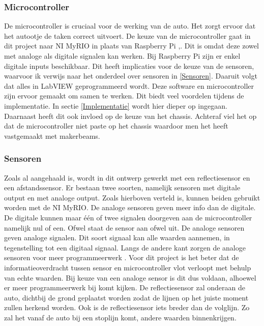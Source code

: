 \documentclass[a4paper,twoside,kulak]{kulakreport} %
\begin{document}
\subsubsection{Microcontroller}
De microcontroller is cruciaal voor de werking van de auto. Het zorgt ervoor dat het autootje de taken correct uitvoert. De keuze van de microcontroller gaat in dit project naar NI MyRIO in plaats van Raspberry Pi \cite{nimyrio},\cite{RaspberryPi}.
Dit is omdat deze zowel met analoge als digitale signalen kan werken. 
Bij Raspberry Pi zijn er enkel digitale inputs beschikbaar. Dit heeft implicaties voor de keuze van de sensoren, waarvoor ik verwijs naar het onderdeel over sensoren in \ref{Sensoren}.
Daaruit volgt dat alles in LabVIEW geprogrammeerd wordt.
Deze software en microcontroller zijn ervoor gemaakt om samen te werken. Dit biedt veel voordelen tijdens de implementatie. In sectie \ref{Implementatie} wordt hier dieper op ingegaan. %
Daarnaast heeft dit ook invloed op de keuze van het chassis. Achteraf viel het op dat de microcontroller niet paste op het chassis waardoor men het heeft vastgemaakt met makerbeams.

\label{Microcontroller}

\subsubsection{Sensoren}
Zoals al aangehaald is, wordt in dit ontwerp gewerkt met een reflectiesensor en een afstandssensor. Er bestaan twee soorten, namelijk sensoren met digitale output en met analoge output. Zoals hierboven verteld is, kunnen beiden gebruikt worden met de NI MyRIO. De analoge sensoren geven meer info dan de digitale. De digitale kunnen maar één of twee signalen doorgeven aan de microcontroller namelijk nul of een. Ofwel staat de sensor aan ofwel uit. De analoge sensoren geven analoge signalen. Dit soort signaal kan alle waarden aannemen, in tegenstelling tot een digitaal signaal. Langs de andere kant zorgen de analoge sensoren voor meer programmeerwerk \cite{DigitaalOfAnaloog}. Voor dit project is het beter dat de informatieoverdracht tussen sensor en microcontroller vlot verloopt met behulp van echte waarden. Bij keuze van een analoge sensor is dit dus voldaan, alhoewel er meer programmeerwerk bij komt kijken. %
De reflectiesensor zal onderaan de auto, dichtbij de grond geplaatst worden zodat de lijnen op het juiste moment zullen herkend worden. Ook is de reflectiesensor iets breder dan de volglijn. Zo zal het vanaf de auto bij een stoplijn komt, andere waarden binnenkrijgen.
\end{document}
